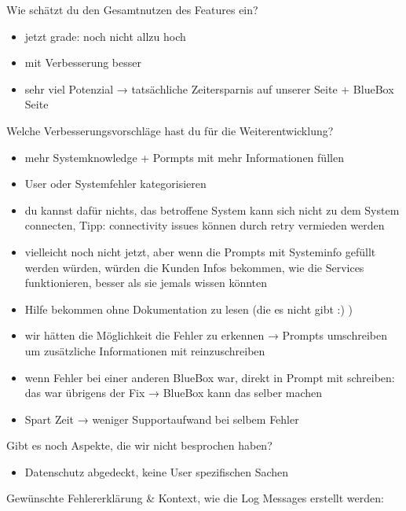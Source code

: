 \documentclass[
  a4paper,
  12pt,
  oneside,
  open=any,
  BCOR=12mm,
  DIV=14,
  parskip=half*,
  headsepline,
  footsepline,
  pointlessnumbers,
  liststotoc,
  numbers=noenddot,
  listof=totoc]{scrartcl}
\providecommand{\tightlist}{%
  \setlength{\itemsep}{0pt}\setlength{\parskip}{0pt}}\usepackage{longtable,booktabs,array}
\begin{document}
Wie schätzt du den Gesamtnutzen des Features ein?

\begin{itemize}
\tightlist
\item
  jetzt grade: noch nicht allzu hoch
\item
  mit Verbesserung besser
\item
  sehr viel Potenzial → tatsächliche Zeitersparnis auf unserer Seite +
  BlueBox Seite
\end{itemize}

Welche Verbesserungsvorschläge hast du für die Weiterentwicklung?

\begin{itemize}
\tightlist
\item
  mehr Systemknowledge + Pormpts mit mehr Informationen füllen
\item
  User oder Systemfehler kategorisieren
\item
  du kannst dafür nichts, das betroffene System kann sich nicht zu dem
  System connecten, Tipp: connectivity issues können durch retry
  vermieden werden
\item
  vielleicht noch nicht jetzt, aber wenn die Prompts mit Systeminfo
  gefüllt werden würden, würden die Kunden Infos bekommen, wie die
  Services funktionieren, besser als sie jemals wissen könnten
\item
  Hilfe bekommen ohne Dokumentation zu lesen (die es nicht gibt :) )
\item
  wir hätten die Möglichkeit die Fehler zu erkennen → Prompts
  umschreiben um zusätzliche Informationen mit reinzuschreiben
\item
  wenn Fehler bei einer anderen BlueBox war, direkt in Prompt mit
  schreiben: das war übrigens der Fix → BlueBox kann das selber machen
\item
  Spart Zeit → weniger Supportaufwand bei selbem Fehler
\end{itemize}

Gibt es noch Aspekte, die wir nicht besprochen haben?

\begin{itemize}
\tightlist
\item
  Datenschutz abgedeckt, keine User spezifischen Sachen
\end{itemize}

Gewünschte Fehlererklärung \& Kontext, wie die Log Messages erstellt
werden:
\end{document}
